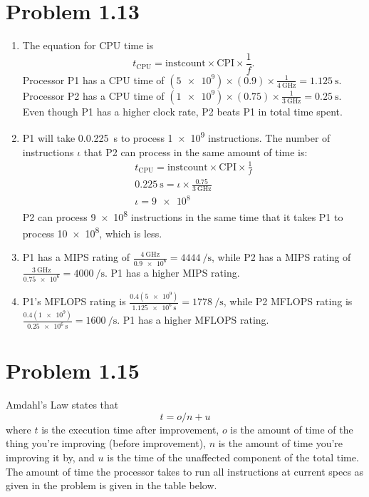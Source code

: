 \documentclass{article}
\begin{document}
\section*{Problem 1.13}
\begin{enumerate}
    \item The equation for CPU time is
    \begin{equation*}
        t_\text{CPU} = \text{instcount} \times \text{CPI} \times \frac1f.
    \end{equation*}
    Processor P1 has a CPU time of \((\num{5e9})\times (0.9) \times \frac{1}{\SI{4}{\giga\hertz}} = \SI{1.125}{\second}\).
    Processor P2 has a CPU time of \((\num{1e9})\times (0.75) \times \frac{1}{\SI{3}{\giga\hertz}} = \SI{0.25}{\second}\).
    Even though P1 has a higher clock rate, P2 beats P1 in total time spent.
    \item P1 will take 0.\SI{0.225}{\second} to process \num{1e9}
    instructions. The number of instructions \(\iota\) that P2
    can process in the same amount of time is:
    \begin{gather*}
        t_\text{CPU} = \text{instcount} \times \text{CPI} \times \frac1f\\
        \SI{0.225}{\second} = \iota \times \frac{0.75}{\SI{3}{\giga\hertz}}\\
        \iota = \num{9e8}
    \end{gather*}
    P2 can process \num{9e8} instructions in the same time
    that it takes P1 to process \num{10e8}, which is less.
    \item P1 has a MIPS rating of \(\frac{\SI{4}{\giga\hertz}}{\num{0.9e6}} = \SI{4444}{\per\second}\),
    while P2 has a MIPS rating of \(\frac{\SI{3}{\giga\hertz}}{\num{0.75e6}} = \SI{4000}{\per\second}\).
    P1 has a higher MIPS rating.
    \item P1's MFLOPS rating is \(\frac{0.4(\num{5e9})}{\SI{1.125e6}{\second}} = \SI{1778}{\per\second}\),
    while P2 MFLOPS rating is \( \frac{0.4(\num{1e9})}{\SI{0.25e6}{\second}} = \SI{1600}{\per\second}\).
    P1 has a higher MFLOPS rating.
\end{enumerate}

\section*{Problem 1.15}
Amdahl's Law states that
\begin{equation*}
    t = o/n + u
\end{equation*} where \(t\) is the execution time after
improvement, \(o\) is the amount of time of the thing
you're improving (before improvement), \(n\) is the amount
of time you're improving it by, and \(u\) is the time of
the unaffected component of the total time.
The amount of time the processor takes to run all
instructions at current specs as given in the problem is
given in the table below.
\end{document}
